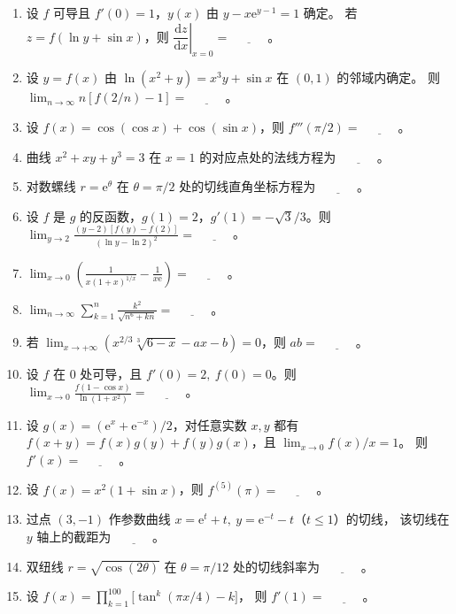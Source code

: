 \documentclass[UTF8,a4paper,zihao=-4,fontset=fandol]{ctexart}
\newcommand{\blank}{\underline{\hspace{3em}}}
\begin{document}
\begin{enumerate}[start=22]
则 $\displaystyle\lim_{x\to0}f'(x)=\blank$。
\item 设 $f$ 可导且 $f'(0)=1$，$y(x)$ 由 $y-x\mathrm{e}^{y-1}=1$ 确定。
若 $z=f(\ln y+\sin x)$，则 $\left.\dfrac{\mathrm{d}z}{\mathrm{d}x}\right|_{x=0}=\blank$。
\item 设 $y=f(x)$ 由 $\ln(x^2+y)=x^3y+\sin x$ 在 $(0,1)$ 的邻域内确定。
则 $\displaystyle\lim_{n\to\infty}n[f(2/n)-1]=\blank$。
\item 设 $f(x)=\cos(\cos x)+\cos(\sin x)$，则 $f'''(\pi/2)=\blank$。
\item 曲线 $x^2+xy+y^3=3$ 在 $x=1$ 的对应点处的法线方程为 $\blank$。
\item 对数螺线 $r=\mathrm{e}^{\theta}$ 在 $\theta=\pi/2$ 处的切线直角坐标方程为 $\blank$。
\item 设 $f$ 是 $g$ 的反函数，$g(1)=2$，$g'(1)=-\sqrt{3}/3$。则
$\displaystyle\lim_{y\to2}\frac{(y-2)[f(y)-f(2)]}{(\ln y-\ln 2)^2}=\blank$。
\item $\displaystyle\lim_{x\to0}\left(\frac{1}{x(1+x)^{1/x}}-\frac1{x\mathrm e}\right)=\blank$。
\item $\displaystyle\lim_{n\to\infty}\sum_{k=1}^{n}\frac{k^2}{\sqrt{n^6+kn}}=\blank$。
\item 若 $\displaystyle\lim_{x\to+\infty}\left(x^{2/3}\sqrt[3]{6-x}-ax-b\right)=0$，则 $ab=\blank$。
\item 设 $f$ 在 $0$ 处可导，且 $f'(0)=2,\ f(0)=0$。则
$\displaystyle\lim_{x\to0}\frac{f(1-\cos x)}{\ln(1+x^2)}=\blank$。
\item 设 $g(x)=(\mathrm{e}^x+\mathrm{e}^{-x})/2$，对任意实数 $x,y$ 都有
$f(x+y)=f(x)g(y)+f(y)g(x)$，且 $\displaystyle\lim_{x\to0} f(x)/x=1$。
则 $f'(x)=\blank$。
\item 设 $f(x)=x^2(1+\sin x)$，则 $f^{(5)}(\pi)=\blank$。
\item 过点 $(3,-1)$ 作参数曲线 $x=\mathrm{e}^t+t,\ y=\mathrm{e}^{-t}-t$（$t\le1$）的切线，
该切线在 $y$ 轴上的截距为 $\blank$。
\item 双纽线 $r=\sqrt{\cos(2\theta)}$ 在 $\theta=\pi/12$ 处的切线斜率为 $\blank$。
\item 设 $f(x)=\displaystyle\prod_{k=1}^{100}\big[\tan^k(\pi x/4)-k\big]$，
则 $f'(1)=\blank$。
\end{enumerate}
\end{document}
